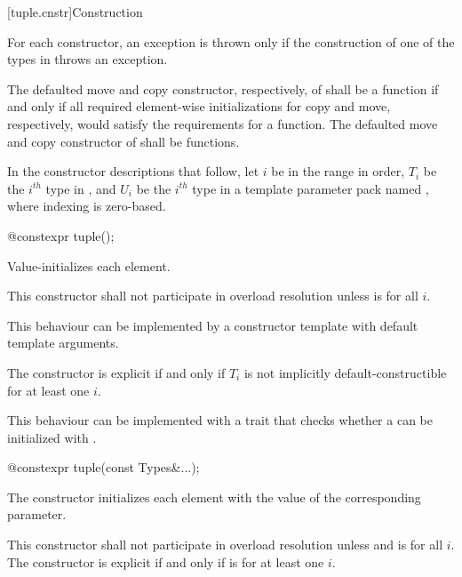[tuple.cnstr]{Construction}

\pnum
For each  constructor, an exception is thrown only if the construction of
one of the types in  throws an exception.

\pnum
The defaulted move and copy constructor, respectively, of
 shall be a  function if and only if all
required element-wise initializations for copy and move, respectively,
would satisfy the requirements for a  function. The
defaulted move and copy constructor of  shall be
 functions.

\pnum
In the constructor descriptions that follow, let $i$ be in the range
 in order, $T_i$ be the $i^{th}$ type in , and
$U_i$ be the $i^{th}$ type in a template parameter pack named , where indexing
is zero-based.

%
\begin{itemdecl}
@\EXPLICIT@ constexpr tuple();
\end{itemdecl}

\begin{itemdescr}
\pnum
\effects Value-initializes each element.

\pnum
\remarks
This constructor shall not participate in overload resolution unless
 is  for all $i$.
\begin{note} This behaviour can be implemented by a constructor template
with default template arguments. \end{note}
The constructor is explicit if and only if $T_i$ is not implicitly
default-constructible for at least one $i$.
\begin{note} This behaviour can be implemented with a trait that checks whether
a  can be initialized with \tcode{\{\}}. \end{note}
\end{itemdescr}

%
\begin{itemdecl}
@\EXPLICIT@ constexpr tuple(const Types&...);
\end{itemdecl}

\begin{itemdescr}
\pnum
\effects The constructor initializes each element with the value of the
corresponding parameter.

\pnum
\remarks This constructor shall not participate in overload resolution unless
 and 
is  for all $i$. The constructor is explicit if and only if
 is 
for at least one $i$.
\end{itemdescr}

